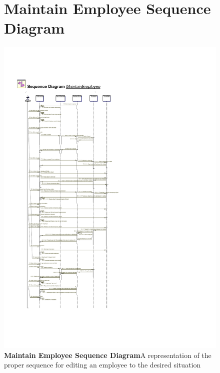 \documentclass[letterpaper,12pt]{report}
\begin{document}
\begin{figure}[hbp]
 \section{Maintain Employee Sequence Diagram}
 \includegraphics[scale=0.65]{externals/SequenceDiagrams9.pdf}
 \caption{\small
\textbf{Maintain Employee Sequence Diagram}\newline A representation of the proper sequence for editing an employee to the desired situation}\label{fig:seqMaintEmp}
\end{figure}
\newpage
\end{document}
